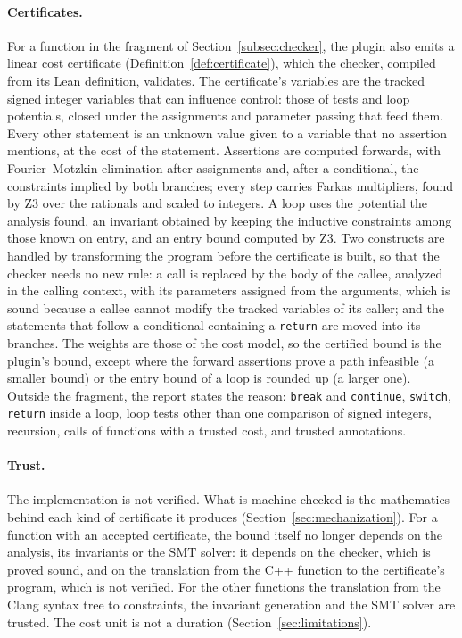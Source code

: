 \documentclass[oneside,english]{amsart}
\numberwithin{equation}{section}
\numberwithin{figure}{section}
\theoremstyle{plain}
\theoremstyle{definition}
\theoremstyle{plain}
\theoremstyle{remark}
\theoremstyle{plain}
\theoremstyle{definition}
\theoremstyle{plain}
\theoremstyle{remark}
\begin{document}
\paragraph{Certificates.}
For a function in the fragment of Section~\ref{subsec:checker}, the plugin also emits a linear cost certificate (Definition~\ref{def:certificate}), which the checker, compiled from its Lean definition, validates. The certificate's variables are the tracked signed integer variables that can influence control: those of tests and loop potentials, closed under the assignments and parameter passing that feed them. Every other statement is an unknown value given to a variable that no assertion mentions, at the cost of the statement. Assertions are computed forwards, with Fourier--Motzkin elimination after assignments and, after a conditional, the constraints implied by both branches; every step carries Farkas multipliers, found by Z3 over the rationals and scaled to integers. A loop uses the potential the analysis found, an invariant obtained by keeping the inductive constraints among those known on entry, and an entry bound computed by Z3. Two constructs are handled by transforming the program before the certificate is built, so that the checker needs no new rule: a call is replaced by the body of the callee, analyzed in the calling context, with its parameters assigned from the arguments, which is sound because a callee cannot modify the tracked variables of its caller; and the statements that follow a conditional containing a \texttt{return} are moved into its branches. The weights are those of the cost model, so the certified bound is the plugin's bound, except where the forward assertions prove a path infeasible (a smaller bound) or the entry bound of a loop is rounded up (a larger one). Outside the fragment, the report states the reason: \texttt{break} and \texttt{continue}, \texttt{switch}, \texttt{return} inside a loop, loop tests other than one comparison of signed integers, recursion, calls of functions with a trusted cost, and trusted annotations.

\paragraph{Trust.}
The implementation is not verified. What is machine-checked is the mathematics behind each kind of certificate it produces (Section~\ref{sec:mechanization}). For a function with an accepted certificate, the bound itself no longer depends on the analysis, its invariants or the SMT solver: it depends on the checker, which is proved sound, and on the translation from the C++ function to the certificate's program, which is not verified. For the other functions the translation from the Clang syntax tree to constraints, the invariant generation and the SMT solver are trusted. The cost unit is not a duration (Section~\ref{sec:limitations}).
\end{document}
